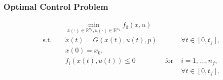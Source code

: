 

\begin{frame}
\frametitle{Optimal Control Problem}
\begin{block}{}
\begin{align*}
 &&& \min_{x(\cdot)\in \mathbb{R}^{n_{x}}, u(\cdot)\in \mathbb{R}^{n_{u}}}  f_{0}(x, u)\\
& \text{ s.t. } && \dot{x}(t) = G(x(t), u(t), p) && \forall t \in [0, t_f],\\
&&& x(0) = x_0,\\
&&&  f_{i}(x(t),u(t)) \leq 0 & \text{ for } & i=1,\ldots,n_{f},\\
 &&&&& \forall t \in [0, t_f].
\end{align*}
\end{block}
\end{frame}